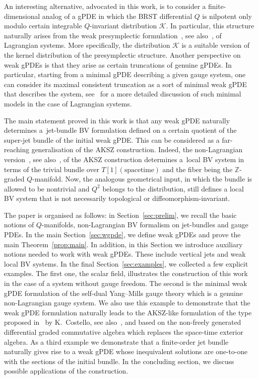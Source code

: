 \documentclass[10pt,a4paper]{amsart}
\numberwithin{equation}{section}
\theoremstyle{definition}
\newcommand{\changed}[1]{{#1}}
\newcommand{\fZ}{\mathbb{Z}}
\def\cK{\mathcal{K}}
\begin{document}
An interesting alternative, advocated in this work, is to consider a finite-dimensional analog of a gPDE in which the BRST differential $Q$ is nilpotent only modulo certain integrable $Q$-invariant distribution $\cK$. In particular, this structure naturally arises from the weak presymplectic formulation~\cite{Dneprov:2024cvt, Grigoriev:2022zlq}, see also~\cite{Alkalaev:2013hta,Dneprov:2022jyn,Grigoriev:2016wmk,Grigoriev:2020xec,Sharapov:2021drr}, of Lagrangian systems. More specifically, the distribution $\cK$ is a suitable version of the kernel distribution of the presymplectic structure. Another perspective on weak gPDEs is that they arise as certain truncations of genuine gPDEs. In particular, starting from a minimal gPDE describing a given gauge system, one can consider its maximal consistent truncation as a sort of minimal weak gPDE that describes the system, see~\cite{Dneprov:2024cvt} for a more detailed discussion of such minimal models in the case of Lagrangian systems.

The main statement proved in this work is that any weak gPDE naturally determines a~jet-bundle BV formulation defined on a certain quotient of the super-jet bundle of the initial weak gPDE. This can be considered as a far-reaching generalisation of the AKSZ construction. Indeed, the non-Lagrangian version~\cite{Barnich:2006hbb,Grigoriev:2006tt}, see also~\cite{Barnich:2009jy, Kotov:2007nr}, of the AKSZ construction determines a~local BV system in terms of the trivial bundle over $T[1](\text{spacetime})$ and the
fiber being the $\fZ$-graded $Q$-manifold. Now, the analogous geometrical input, in which the bundle is allowed to be nontrivial and $Q^2$ belongs to the distribution, still defines a local BV system that is not necessarily topological or diffeomorphism-invariant.

The paper is organised as follows: in Section~\ref{sec:prelim}, we recall the basic notions of $Q$-manifolds, non-Lagrangian BV formalism on jet-bundles and gauge PDEs. In the main Section~\ref{sec:wgpde}, we define weak gPDEs and prove the main Theorem~\ref{prop:main}. In addition, in this Section we introduce auxiliary notions needed to work with weak gPDEs. These include vertical jets and weak local BV systems.
In the final Section~\ref{sec:examples}, we collected a few explicit examples. The first one, the scalar field, illustrates the construction of this work in the case of a system without gauge freedom. The second is the minimal weak gPDE formulation of the self-dual Yang--Mills gauge theory which is a genuine non-Lagrangian gauge system. \changed{We also use this example to demonstrate that the weak gPDE formulation naturally leads to the AKSZ-like formulation of the type proposed in~\cite{costello2011renormalization} by K.~Costello, see also~\cite{Bonechi:2022aji,Bonechi:2009kx,Grigoriev:2025vsl}, and based on the non-freely generated differential graded commutative algebra which replaces the space-time exterior algebra.} As a third example we demonstrate that a finite-order jet bundle naturally gives rise to a weak gPDE whose inequivalent solutions are one-to-one with the sections of the initial bundle. In the concluding section, we discuss possible applications of the construction.
\end{document}
